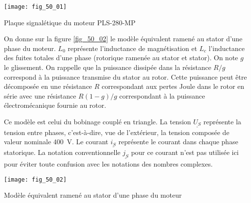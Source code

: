 \begin{marginfigure}
\centering
\texttt{[image: fig\_50\_01]}
\caption{Plaque signalétique du moteur PLS-280-MP \label{fig_50_01}}
\end{marginfigure}
\fi

\ifprof
\else
\fi

\ifprof
\else
\fi

\ifprof
\else

On donne sur la figure \autoref{fig_50_02} le modèle équivalent ramené au stator d’une phase du moteur.
$L_0$ représente l’inductance de magnétisation et $L_c$ l’inductance des fuites totales d’une
phase (rotorique ramenée au stator et stator). On note $g$ le glissement. On rappelle que la
puissance dissipée dans la résistance $R/g$ correspond à la puissance transmise du stator
au rotor. Cette puissance peut être décomposée en une résistance $R$ correspondant aux
pertes Joule dans le rotor en série avec une résistance $R(1 - g)/g$ correspondant à la
puissance électromécanique fournie au rotor.

\begin{rem}
Ce modèle est celui du bobinage couplé en triangle. La tension $\underline{U_S}$ représente
la tension entre phases, c’est-à-dire, vue de l’extérieur, la tension composée de valeur
nominale \SI{400}{V}. Le courant $\underline{i_S}$ représente le courant dans chaque phase statorique. La
notation conventionnelle $\underline{j_S}$ pour ce courant n’est pas utilisée ici pour éviter toute confusion
avec les notations des nombres complexes.
\end{rem}

\begin{marginfigure}
\centering
\texttt{[image: fig\_50\_02]}
\caption{Modèle équivalent ramené au stator d’une phase du moteur \label{fig_50_02}}
\end{marginfigure}
\fi
{}
\ifprof
\else
\fi


\ifprof
\else
\fi

